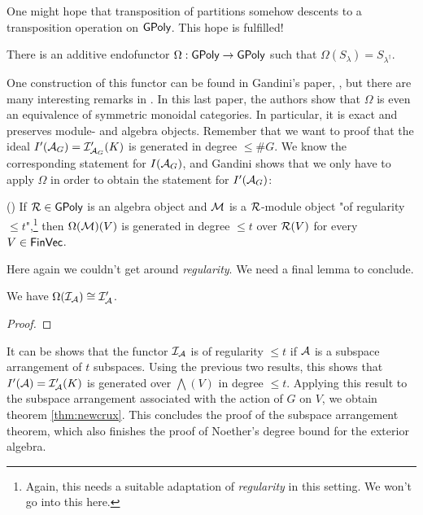 \documentclass[../main.tex]{subfiles}
\begin{document}
One might hope that transposition of partitions somehow descents to 
a transposition operation on $\textnormal{$\textsf{GPoly}$}$. This hope is fulfilled!
\begin{thm}[]
    There is an additive endofunctor $\Omega: \textnormal{$\textsf{GPoly}$} \to \textnormal{$\textsf{GPoly}$}$ such that 
    $\Omega(S_\lambda) = S_{\lambda^\dagger}$.
\end{thm}
One construction of this functor can be found in Gandini's paper,
\cite{Gandini2019ResOfIdeals}, but there are many interesting remarks in
\cite{sam2012introduction}. In this last paper, the authors show that $\Omega$
is even an equivalence of symmetric monoidal categories. In particular, 
it is exact and preserves module- and algebra objects. Remember that we want to
proof that the ideal $I'(\mathcal{A}_G) = \mathcal{I}'_{\mathcal{A}_G}(K)$ is generated in degree $\leq
\#G$. We know the corresponding statement for $I(\mathcal{A}_G)$, and Gandini shows
that we only have to apply $\Omega$ in order to obtain the statement for
$I'(\mathcal{A}_G)$:
\begin{prop}(\cite[Proposition 6.1]{Gandini2019ResOfIdeals})
    If $\mathcal{R} \in \textnormal{$\textsf{GPoly}$}$ is an algebra object and $\mathcal{M}$ is a $\mathcal{R}$-module object
    "of regularity $\leq t$",\footnote{Again, this needs a suitable adaptation of \emph{regularity} in this setting. We won't go into this here.} then $\Omega(\mathcal{M})(V)$ is generated in degree 
    $\leq t$ over $\mathcal{R}(V)$ for every $V \in \textnormal{$\textsf{FinVec}$}$. 
\end{prop}
Here again we couldn't get around \textit{regularity}. We need a final lemma to
conclude.
\begin{lem}
    We have $\Omega(\mathcal{I}_{\mathcal{A}}) \cong \mathcal{I}'_{\mathcal{A}}$.
\end{lem}
\begin{proof}
\end{proof}

It can be shows that the functor $\mathcal{I}_{\mathcal{A}}$ is of regularity $\leq t$ if
$\mathcal{A}$ is a subspace arrangement of $t$ subspaces. Using the previous two 
results, this shows that $I'(\mathcal{A}) = \mathcal{I}'_{\mathcal{A}}(K)$ is generated over $\bigwedge(V)$
in degree $\leq t$. Applying this result to the subspace arrangement 
associated with the action of $G$ on $V$, we obtain theorem \ref{thm:newcrux}.
This concludes the proof of the subspace arrangement theorem, which also
finishes the proof of Noether's degree bound for the exterior algebra.
\end{document}
